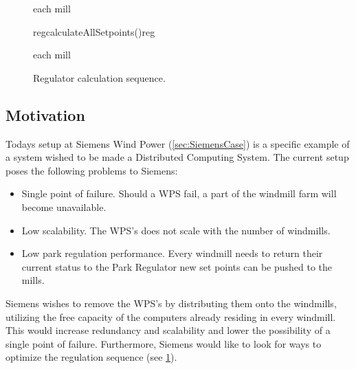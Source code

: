 \begin{figure}
	\centering
	\begin{sequencediagram} %
	
		\begin{sdblock}{each mill}{}
		\end{sdblock}
		
		\begin{call}{reg}{calculateAllSetpoints()}{reg}{}
		\end{call}
	
		\begin{sdblock}{each mill}{}
		\end{sdblock}
					
	\end{sequencediagram}

	\caption[Regulator calculation sequence]{
		\label{fig:dataComputationSequence} 
		\footnotesize{%
			Regulator calculation sequence.
		}
	}
\end{figure}

\subsection{Motivation}

Todays setup at Siemens Wind Power (\cref{sec:SiemensCase}) is a specific example of a system wished to be made a Distributed Computing System. The current setup poses the following problems to Siemens:  

\begin{itemize} 
	\item Single point of failure. Should a WPS fail, a part of the windmill farm will become unavailable.
	\item Low scalability. The WPS's does not scale with the number of windmills.
	\item Low park regulation performance. Every windmill needs to return their current status to the Park Regulator new set points can be pushed to the mills.
\end{itemize}

Siemens wishes to remove the WPS's by distributing them onto the windmills, utilizing the free capacity of the computers already residing in every windmill. This would increase redundancy and scalability and lower the possibility of a single point of failure. Furthermore, Siemens would like to look for ways to optimize the regulation sequence (see \cref{fig:dataComputationSequence}).




